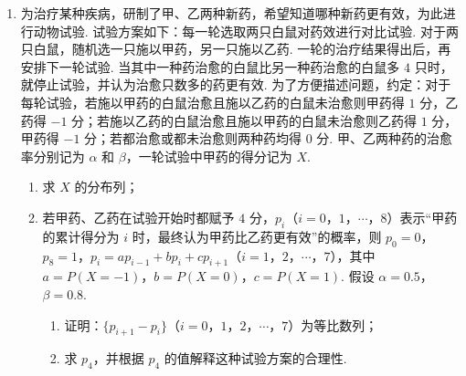 \begin{description}
\begin{enumerate}[leftmargin=5pt]
\begin{enumerate}
\item \(f(x)\) 有且仅有 \(2\) 个零点.
\end{enumerate}

        \item 为治疗某种疾病，研制了甲、乙两种新药，希望知道哪种新药更有效，为此进行动物试验. 试验方案如下：每一轮选取两只白鼠对药效进行对比试验. 对于两只白鼠，随机选一只施以甲药，另一只施以乙药. 一轮的治疗结果得出后，再安排下一轮试验. 当其中一种药治愈的白鼠比另一种药治愈的白鼠多 \(4\) 只时，就停止试验，并认为治愈只数多的药更有效. 为了方便描述问题，约定：对于每轮试验，若施以甲药的白鼠治愈且施以乙药的白鼠未治愈则甲药得 \(1\) 分，乙药得 \(-1\) 分；若施以乙药的白鼠治愈且施以甲药的白鼠未治愈则乙药得 \(1\) 分，甲药得 \(-1\) 分；若都治愈或都未治愈则两种药均得 \(0\) 分. 甲、乙两种药的治愈率分别记为 \(\alpha\) 和 \(\beta\)，一轮试验中甲药的得分记为 \(X\).

\begin{enumerate}
\item 求 \(X\) 的分布列；

\item 若甲药、乙药在试验开始时都赋予 \(4\) 分，\(p_i\)（\(i=0\)，\(1\)，\(\cdots\)，\(8\)）表示“甲药的累计得分为 \(i\) 时，最终认为甲药比乙药更有效”的概率，则 \(p_0=0\)，\(p_8=1\)，\(p_i=ap_{i-1}+bp_i+cp_{i+1}\)（\(i=1\)，\(2\)，\(\cdots\)，\(7\)），其中 \(a=P(X=-1)\)，\(b=P(X=0)\)，\(c=P(X=1)\). 假设 \(\alpha=0.5\)，\(\beta=0.8\).

\begin{enumerate}
\item 证明：\(\{p_{i+1}-p_i\}\)（\(i=0\)，\(1\)，\(2\)，\(\cdots\)，\(7\)）为等比数列；
\item 求 \(p_4\)，并根据 \(p_4\) 的值解释这种试验方案的合理性.
\end{enumerate}
\end{enumerate}

    \end{enumerate}

\end{description}

